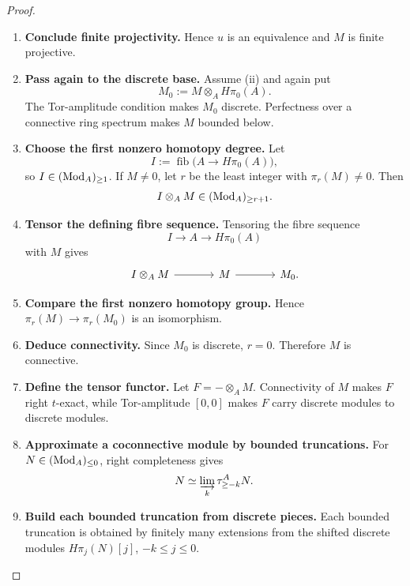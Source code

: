 \begin{proof}
\begin{enumerate}[label=\textup{(\arabic*)}]
    \item \textbf{Conclude finite projectivity.}
    Hence \(u\) is an equivalence and
    \(M\) is finite projective.

    \item \textbf{Pass again to the discrete base.}
    Assume \textup{(ii)} and again put
    \[
        M_0:=M\otimes_AH\pi_0(A).
    \]
    The Tor-amplitude condition makes \(M_0\) discrete. Perfectness over a
    connective ring spectrum makes \(M\) bounded below.

    \item \textbf{Choose the first nonzero homotopy degree.}
    Let
    \[
        I:=\operatorname{fib}\bigl(A\to H\pi_0(A)\bigr),
    \]
    so \(I\in(\operatorname{Mod}_{A})_{\geq1}\). If \(M\neq0\), let \(r\) be the least
    integer with \(\pi_r(M)\neq0\). Then
    \[
        I\otimes_AM\in(\operatorname{Mod}_{A})_{\geq r+1}.
    \]

    \item \textbf{Tensor the defining fibre sequence.}
    Tensoring the fibre sequence
    \[
        I\longrightarrow A\longrightarrow H\pi_0(A)
    \]
    with \(M\) gives
    \[
    \begin{tikzcd}[column sep=large]
        I\otimes_AM \arrow[r] & M \arrow[r] & M_0.
    \end{tikzcd}
    \]

    \item \textbf{Compare the first nonzero homotopy group.}
    Hence \(\pi_r(M)\to\pi_r(M_0)\) is an isomorphism.

    \item \textbf{Deduce connectivity.}
    Since \(M_0\) is
    discrete, \(r=0\). Therefore \(M\) is connective.

    \item \textbf{Define the tensor functor.}
    Let \(F=-\otimes_AM\). Connectivity of \(M\) makes \(F\) right
    \(t\)-exact, while Tor-amplitude \([0,0]\) makes \(F\) carry discrete
    modules to discrete modules.

    \item \textbf{Approximate a coconnective module by bounded truncations.}
    For \(N\in(\operatorname{Mod}_{A})_{\leq0}\), right
    completeness gives
    \[
        N\simeq\varinjlim_k\tau_{\geq-k}^{A}N.
    \]

    \item \textbf{Build each bounded truncation from discrete pieces.}
    Each bounded truncation is obtained by finitely many extensions from the
    shifted discrete modules \(H\pi_j(N)[j]\), \(-k\leq j\leq0\).


\end{enumerate}
\end{proof}
